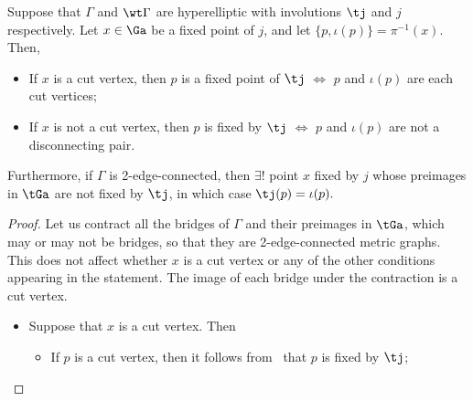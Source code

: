 {\begin{prop}\label{fixedpoints}
Suppose that $\Gamma$ and $\wt\Gamma$ are hyperelliptic with involutions  $\tj$ and $j$ respectively.  Let $x\in \Ga$ be a fixed point of $j$, and let $\{p,\iota(p)\}=\pi^{-1}(x)$. Then, 
    \begin{itemize}
        \item[i)] If $x$ is a cut vertex, then $p$ is a fixed point of $\tj$ $\Longleftrightarrow $ $p$ and $\iota(p)$ are each cut vertices;
        \item[ii)]  If $x$ is not a cut vertex, then $p$ is fixed by $\tj$ $\Longleftrightarrow $ $p$ and $\iota(p)$ are not a disconnecting pair.
    \end{itemize}

    \noindent Furthermore, if $\Gamma$ is 2-edge-connected, then $\exists!$  point $x$ fixed by $j$  whose preimages in $\tGa$ are not fixed by $\tj$, in which case $\tj(p)=\iota(p).$ 
    \end{prop}
    
    \begin{proof}    Let us contract all the bridges of $\Gamma$ and their preimages in $\tGa$, which may or may not be bridges, so that they are 2-edge-connected metric graphs. This does not affect whether $x$ is a cut vertex or any of the other conditions appearing in the statement. 
    The image of each bridge under the contraction is  a cut vertex. 
        \begin{itemize}
            \item [i)] Suppose that $x$ is a cut vertex. Then
            \begin{itemize}
                \item [$(\Leftarrow)$] If $p$ is a cut vertex, then it follows from~\cite[Lemma 3.10]{CH} that $p$ is fixed by $\tj$;
                

\end{itemize}
\end{itemize}
\end{proof}}
